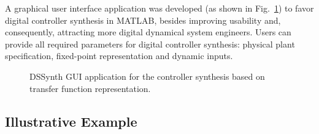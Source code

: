 \documentclass[10pt,conference]{IEEEtran}
\begin{document}
A graphical user interface application was developed (as shown in Fig.~\ref{fig:gui-for-tf}) 
to favor digital controller synthesis in MATLAB, besides improving usability and, 
consequently, attracting more digital dynamical system engineers. Users can provide all 
required parameters for digital controller synthesis: physical plant specification, 
fixed-point representation and dynamic inputs. 
%
\begin{figure}[ht]
    \centering
		\hfil
		\hfil
		\hfil
		\hfil
    \caption{DSSynth GUI application for the controller synthesis based on transfer function representation.}
    \label{fig:gui-for-tf}
\end{figure}

\subsection{Illustrative Example}
\end{document}
